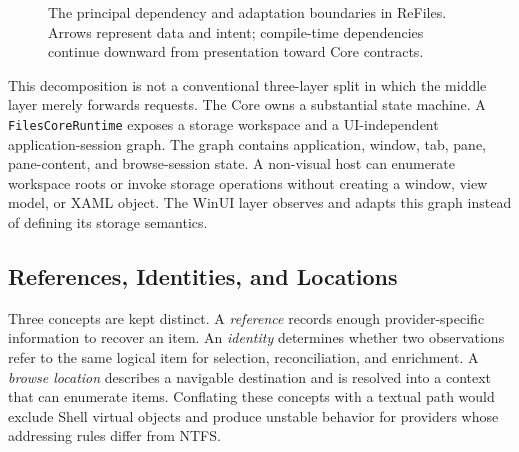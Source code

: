 \documentclass[10pt,a4paper,twoside]{article}
\begin{document}
\begin{figure}[htbp]
  \centering
  \caption{The principal dependency and adaptation boundaries in ReFiles. Arrows represent data and intent;
  compile-time dependencies continue downward from presentation toward Core contracts.}
  \label{figure:layers}
\end{figure}

This decomposition is not a conventional three-layer split in which the middle layer merely forwards requests.
The Core owns a substantial state machine. A \texttt{FilesCoreRuntime} exposes a storage workspace and a
UI-independent application-session graph. The graph contains application, window, tab, pane, pane-content, and
browse-session state. A non-visual host can enumerate workspace roots or invoke storage operations without
creating a window, view model, or XAML object. The WinUI layer observes and adapts this graph instead of defining
its storage semantics.

\subsection{References, Identities, and Locations}

Three concepts are kept distinct. A \emph{reference} records enough provider-specific information to recover an
item. An \emph{identity} determines whether two observations refer to the same logical item for selection,
reconciliation, and enrichment. A \emph{browse location} describes a navigable destination and is resolved into
a context that can enumerate items. Conflating these concepts with a textual path would exclude Shell virtual
objects and produce unstable behavior for providers whose addressing rules differ from NTFS.
\end{document}
